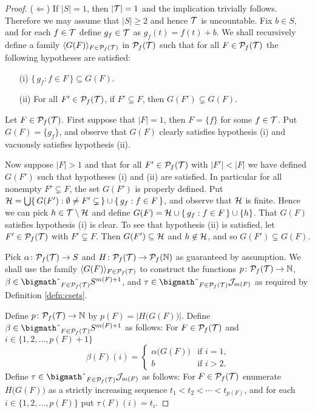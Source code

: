 \begin{proof}
  ($\Leftarrow$)
  If $|S| = 1$, then $|\mathcal{T}| = 1$ and the implication trivially follows. 
  Therefore we may assume that $|S| \ge 2$ and hence $\mathcal{T}$ is uncountable. 
  Fix $b \in S$, and for each $f \in \mathcal{T}$ define $g_f \in \mathcal{T}$ as $g_f(t) = f(t) + b$. 
  We shall recursively define a family $\langle G(F) \rangle_{F \in \mathcal{P}_f(\mathcal{T})}$ in $\mathcal{P}_f(\mathcal{T})$ such that for all $F \in \mathcal{P}_f(\mathcal{T})$ the following hypotheses are satisfied: 
  \begin{itemize}
    \item[(i)]
      $\{\, g_f : f \in F \,\} \subseteq G(F)$.

    \item[(ii)]
      For all $F' \in \mathcal{P}_f(\mathcal{T})$, if $F' \subsetneq F$, then $G(F') \subsetneq G(F)$. 
  \end{itemize}

  Let $F \in \mathcal{P}_f(\mathcal{T})$. 
  First suppose that $|F| = 1$, then $F = \{f\}$ for some $f \in \mathcal{T}$.
  Put $G(F) = \{g_f\}$, and observe that $G(F)$ clearly satisfies hypothesis (i) and vacuously satisfies hypothesis (ii). 

  Now suppose $|F| > 1$ and that for all $F' \in \mathcal{P}_f(\mathcal{T})$ with $|F'| < |F|$ we have defined $G(F')$ such that hypotheses (i) and (ii) are satisfied. 
  In particular for all nonempty $F' \subsetneq F$, the set $G(F')$ is properly defined. 
  Put $\mathcal{H} = \bigcup\{\, G(F') : \emptyset \ne F' \subsetneq \,\} \cup \{\, g_f : f \in F \,\}$, and observe that $\mathcal{H}$ is finite. 
  Hence we can pick $h \in \mathcal{T} \setminus \mathcal{H}$ and define $G(F) = \mathcal{H} \cup \{\, g_f : f \in F \,\} \cup \{h\}$. 
  That $G(F)$ satisfies hypothesis (i) is clear. 
  To see that hypothesis (ii) is satisfied, let $F' \in \mathcal{P}_f(\mathcal{T})$ with $F' \subsetneq F$.
  Then $G(F') \subseteq \mathcal{H}$ and $h \not\in \mathcal{H}$, and so $G(F') \subsetneq G(F)$.   
  
  Pick $\alpha \colon \mathcal{P}_f(\mathcal{T}) \to S$ and $H \colon \mathcal{P}_f(\mathcal{T}) \to \mathcal{P}_f(\mathbb{N})$ as guaranteed by assumption.
  We shall use the family $\langle G(F) \rangle_{F \in \mathcal{P}_f(\mathcal{T})}$ to construct the functions $p \colon \mathcal{P}_f(\mathcal{T}) \to \mathbb{N}$, $\beta \in \bigtimes_{F \in \Pf(\calT)} S^{m(F)+1}$, and $\tau \in \bigtimes_{F \in \Pf(\calT)} \calJ_{m(F)}$ as required by Definition \ref{defn:csets}.

  Define $p \colon \mathcal{P}_f(\mathcal{T}) \to \mathbb{N}$ by $p(F) = |H\bigl( G(F) \bigr)|$. 
  Define $\beta \in \bigtimes_{F \in \Pf(\calT)} S^{m(F)+1}$ as follows:
  For $F \in \mathcal{P}_f(\mathcal{T})$ and $i \in \{1, 2, \ldots, p(F)+1\}$
  \[
    \beta(F)(i) =
    \begin{cases}
      \alpha \bigl( G(F) \bigr) & \mbox{if $i=1$,} \\
      b & \mbox{if $i > 2$}.
    \end{cases}
  \]
  Define $\tau \in \bigtimes_{F \in \Pf(\calT)} \calJ_{m(F)}$ as follows:
  For $F \in \mathcal{P}_f(\mathcal{T})$ enumerate $H \bigl( G(F) \bigr)$ as a strictly increasing sequence $t_1 < t_2 < \cdots < t_{p(F)}$, and for each $i \in \{1, 2, \ldots, p(F)\}$ put $\tau(F)(i) = t_i$.
  

\end{proof}
